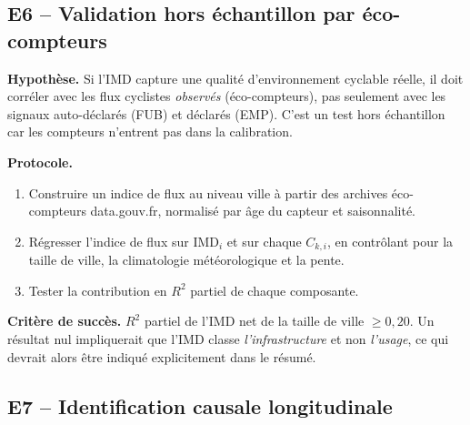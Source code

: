 \documentclass[11pt,a4paper]{article}
\newcommand{\IMD}{\mathrm{IMD}}
\begin{document}
\subsection{E6 -- Validation hors échantillon par éco-compteurs}

\begin{experience}[title=E6 -- Validation comportementale indépendante]
\textbf{Hypothèse.} Si l'IMD capture une qualité d'environnement
cyclable réelle, il doit corréler avec les flux cyclistes
\emph{observés} (éco-compteurs), pas seulement avec les signaux
auto-déclarés (FUB) et déclarés (EMP). C'est un test hors
échantillon car les compteurs n'entrent pas dans la calibration.

\textbf{Protocole.}
\begin{enumerate}[leftmargin=*,itemsep=0.2em]
    \item Construire un indice de flux au niveau ville à partir
    des archives éco-compteurs data.gouv.fr, normalisé par âge du
    capteur et saisonnalité.
    \item Régresser l'indice de flux sur $\IMD_i$ et sur chaque
    $C_{k,i}$, en contrôlant pour la taille de ville, la
    climatologie météorologique et la pente.
    \item Tester la contribution en $R^2$ partiel de chaque
    composante.
\end{enumerate}

\textbf{Critère de succès.} $R^2$ partiel de l'IMD net de la
taille de ville $\geq 0{,}20$. Un résultat nul impliquerait que
l'IMD classe \emph{l'infrastructure} et non \emph{l'usage}, ce
qui devrait alors être indiqué explicitement dans le résumé.
\end{experience}

\subsection{E7 -- Identification causale longitudinale}
\end{document}
